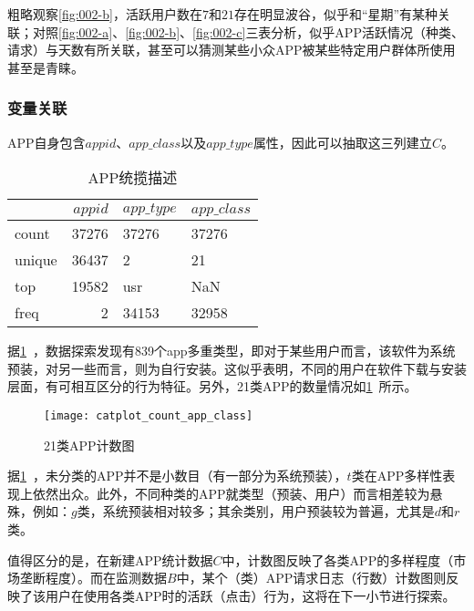 \documentclass[withoutpreface,bwprint]{cumcmthesis}
\begin{document}
粗略观察\cref{fig:002-b}，活跃用户数在$7$和$21$存在明显波谷，似乎和“星期”有某种关联；对照\cref{fig:002-a}、\cref{fig:002-b}、\cref{fig:002-c}三表分析，似乎APP活跃情况（种类、请求）与天数有所关联，甚至可以猜测某些小众APP被某些特定用户群体所使用甚至是青睐。

\subsubsection{变量关联}

APP自身包含$appid$、$app\_class$以及$app\_type$属性，因此可以抽取这三列建立$C$。

\begin{table}[!htbp]
    \caption{APP统揽描述}\label{tab:003} \centering
    \begin{tabular}{lrll}
        \toprule
               & $appid$ & $app\_type$ & $app\_class$ \\
        \midrule
        count  & 37276   & 37276       & 37276        \\
        unique & 36437   & 2           & 21           \\
        top    & 19582   & usr         & NaN          \\
        freq   & 2       & 34153       & 32958        \\
        \bottomrule
    \end{tabular}
\end{table}

据\cref{tab:003}~，数据探索发现有839个app多重类型，即对于某些用户而言，该软件为系统预装，对另一些而言，则为自行安装。这似乎表明，不同的用户在软件下载与安装层面，有可相互区分的行为特征。另外，21类APP的数量情况如\cref{fig:003}~所示。

\begin{figure}[!htbp]
    \centering
    \texttt{[image: catplot\_count\_app\_class]}
    \caption{21类APP计数图}
    \label{fig:003}
\end{figure}

据\cref{fig:003}~，未分类的APP并不是小数目（有一部分为系统预装），$t$类在APP多样性表现上依然出众。此外，不同种类的APP就类型（预装、用户）而言相差较为悬殊，例如：$g$类，系统预装相对较多；其余类别，用户预装较为普遍，尤其是$d$和$r$类。

值得区分的是，在新建APP统计数据$C$中，计数图反映了各类APP的多样程度（市场垄断程度）。而在监测数据$B$中，某个（类）APP请求日志（行数）计数图则反映了该用户在使用各类APP时的活跃（点击）行为，这将在下一小节进行探索。
\end{document}
